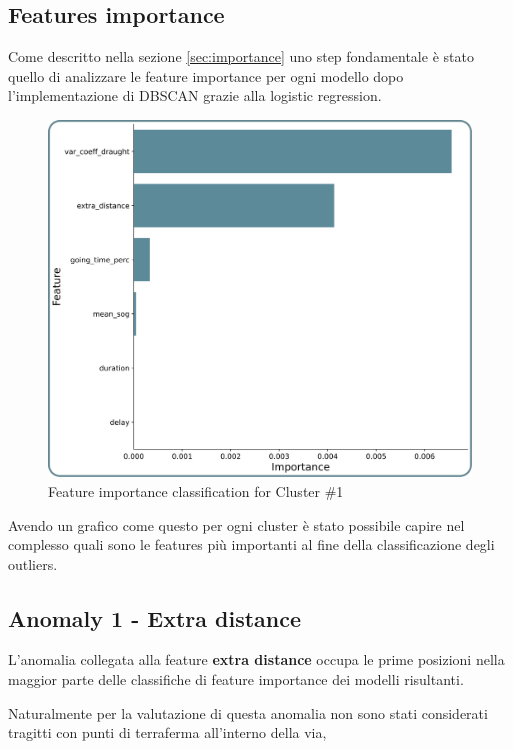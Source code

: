 \subsection{Features importance}
\label{sec:testing-importance}

Come descritto nella sezione \ref{sec:importance} uno step fondamentale è stato quello di analizzare le feature importance per ogni modello dopo l'implementazione di DBSCAN grazie alla logistic regression.

\begin{figure}[H]
    \centering
    \includegraphics[width=13cm]{Images/3/importance.png}
    \caption{Feature importance classification for Cluster \#1}
\end{figure}

Avendo un grafico come questo per ogni cluster è stato possibile capire nel complesso quali sono le features più importanti al fine della classificazione degli outliers.

\subsection{Anomaly 1 - Extra distance}
\label{sec:anomaly-1}

L'anomalia collegata alla feature \textbf{extra distance} occupa le prime posizioni nella maggior parte delle classifiche di feature importance dei modelli risultanti.

Naturalmente per la valutazione di questa anomalia non sono stati considerati tragitti con punti di terraferma all'interno della via, 

